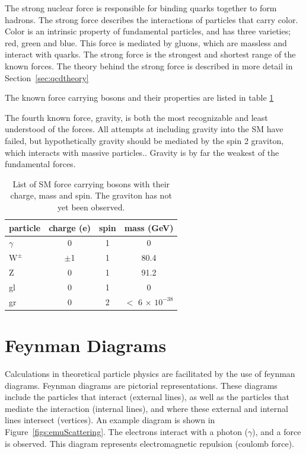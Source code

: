 The strong nuclear force is responsible for binding quarks together to form hadrons.  
The strong force describes the interactions of particles that carry color.  
Color is an intrinsic property of fundamental particles, and has three varieties; red, green and blue.
This force is mediated by gluons, which are massless and interact with quarks.  
The strong force is the strongest and shortest range of the known forces.  
The theory behind the strong force is described in more detail in Section~\ref{sec:qcdtheory}

The known force carrying bosons and their properties are listed in table \ref{table:SMbos}

The fourth known force, gravity, is both the most recognizable and least understood of the forces.  
All attempts at including gravity into the SM have failed, but hypothetically gravity should be mediated by the spin 2 graviton, which interacts with massive particles..
Gravity is by far the weakest of the fundamental forces. 


\begin{table}
\begin{center}
\begin{tabular}{l|c|c|c}
\hline
\hline
particle & charge (e) & spin & mass (GeV)\\ \hline \hline
$\gamma$  & 0 & 1 & 0\\ 
$\mathrm{W^{\pm}}$ & $\pm$1 & 1 & 80.4\\
Z & 0 & 1 & 91.2\\ 
gl & 0 & 1 & 0 \\ 
gr & 0 & 2 & $<$ 6 $\times$ $\mathrm{10^{-38}}$ \\ 
\hline
\end{tabular}
\end{center}
\caption{List of SM force carrying bosons with their charge, mass and spin.  The graviton has not yet been observed.}
\label{table:SMbos}
\end{table}


\section{Feynman Diagrams}
Calculations in theoretical particle physics are facilitated by the use of feynman diagrams.  
Feynman diagrams are pictorial representations.  
These diagrams include the particles that interact (external lines), as well as the particles that mediate the interaction (internal lines), 
and where these external and internal lines intersect (vertices).
An example diagram is shown in Figure~\ref{figs:emuScattering}.  
The electrons interact with a photon ($\gamma$), and a force is observed.
This diagram represents electromagnetic repulsion (coulomb force).  


